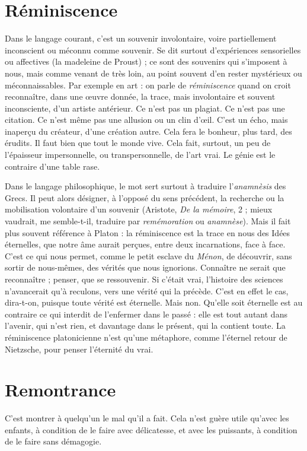 \section{Réminiscence}
Dans le langage courant, c’est un souvenir involontaire,
voire partiellement inconscient ou méconnu comme
souvenir. Se dit surtout d’expériences sensorielles ou affectives (la madeleine de
Proust) ; ce sont des souvenirs qui s'imposent à nous, mais comme venant de
très loin, au point souvent d’en rester mystérieux ou méconnaissables. Par
exemple en art : on parle de {\it réminiscence} quand on croit reconnaître, dans une
œuvre donnée, la trace, mais involontaire et souvent inconsciente, d’un artiste
antérieur. Ce n'est pas un plagiat. Ce n’est pas une citation. Ce n’est même pas
une allusion ou un clin d’œil. C’est un écho, mais inaperçu du créateur, d’une
création autre. Cela fera le bonheur, plus tard, des érudits. Il faut bien que tout
le monde vive. Cela fait, surtout, un peu de l'épaisseur impersonnelle, ou transpersonnelle,
de l’art vrai. Le génie est le contraire d’une table rase.

Dans le langage philosophique, le mot sert surtout à traduire l’{\it anamnèsis}
des Grecs. Il peut alors désigner, à l'opposé du sens précédent, la recherche ou
la mobilisation volontaire d’un souvenir (Aristote, {\it De la mémoire}, 2 ; mieux
vaudrait, me semble-t-il, traduire par {\it remémoration} ou {\it anamnèse}). Mais il fait
plus souvent référence à Platon : la réminiscence est la trace en nous des Idées
éternelles, que notre âme aurait perçues, entre deux incarnations, face à face.
C’est ce qui nous permet, comme le petit esclave du {\it Ménon}, de découvrir, sans
sortir de nous-mêmes, des vérités que nous ignorions. Connaître ne serait que
reconnaître ; penser, que se ressouvenir. Si c'était vrai, l’histoire des sciences
n’avancerait qu’à reculons, vers une vérité qui la précède. C’est en effet le cas,
dira-t-on, puisque toute vérité est éternelle. Mais non. Qu'elle soit éternelle
est au contraire ce qui interdit de l’enfermer dans le passé : elle est tout autant
dans l'avenir, qui n’est rien, et davantage dans le présent, qui la contient toute.
La réminiscence platonicienne n’est qu’une métaphore, comme l’éternel retour
de Nietzsche, pour penser l'éternité du vrai.

\section{Remontrance}
C’est montrer à quelqu’un le mal qu’il a fait. Cela n’est
guère utile qu'avec les enfants, à condition de le faire
avec délicatesse, et avec les puissants, à condition de le faire sans démagogie.


